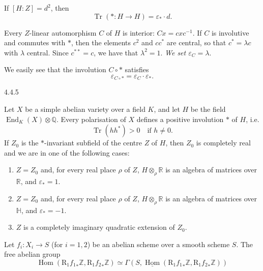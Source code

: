     If \([H:Z]=d^2\), then
    \[       \operatorname {Tr}(*\colon  H\to  H)       = \varepsilon _*\cdot  d.     \]\par{}Every \(Z\)-linear automorphism \(C\) of \(H\) is interior: \(Cx=cxc^{-1}\).
    If \(C\) is involutive and commutes with \(*\), then the elements \(c^2\) and \(cc^*\) are central, so that \(c^*=\lambda  c\) with \(\lambda \) central.
    Since \(c^{**}=c\), we have that \(\lambda ^2=1\).
    \emph{We set \(\varepsilon _C=\lambda \)}.\par{}We easily see that the involution \(C\circ  *\) satisfies
    \[       \varepsilon _{C\circ  *}       = \varepsilon _C\cdot \varepsilon _*.     \]\begin{reminder}{4.4.5}\label{hodge-theory-ii-4.4.5}\skipsinglepar\par{}Let \(X\) be a simple abelian variety over a field \(K\), and let \(H\) be the field \(\operatorname {End}_K(X)\otimes \mathbb {Q}\).
    Every polarisation of \(X\) defines a positive involution \(*\) of \(H\), i.e.
    \[       \operatorname {Tr}(hh^*) > 0       \quad \text {if }h\neq 0.     \]
    If \(Z_0\) is the \(*\)-invariant subfield of the centre \(Z\) of \(H\), then \(Z_0\) is completely real and we are in one of the following cases:

    
 \begin{enumerate}
      
 \item[(a)]
        \(Z=Z_0\) and, for every real place \(\rho \) of \(Z\), \(H\otimes _\rho \mathbb {R}\) is an algebra of matrices over \(\mathbb {R}\), and \(\varepsilon _*=1\).
      


      
 \item[(b)]
        \(Z=Z_0\) and, for every real place \(\rho \) of \(Z\), \(H\otimes _\rho \mathbb {R}\) is an algebra of matrices over \(\mathbb {H}\), and \(\varepsilon _*=-1\).
      


      
 \item[(c)]
        \(Z\) is a completely imaginary quadratic extension of \(Z_0\).
      

    \end{enumerate}\end{reminder}\label{hodge-theory-ii-4.4.6}\par{}Let \(f_i\colon  X_i\to  S\) (for \(i=1,2\)) be an abelian scheme over a smooth scheme \(S\).
    The free abelian group
    \[       \operatorname {Hom}(\mathrm {R}_1{f_1}_*\mathbb {Z},\mathrm {R}_1{f_2}_*\mathbb {Z})       \simeq  \Gamma (S,\underline {\operatorname {Hom}}(\mathrm {R}_1{f_1}_*\mathbb {Z},\mathrm {R}_1{f_2}_*\mathbb {Z}))     \]
    
